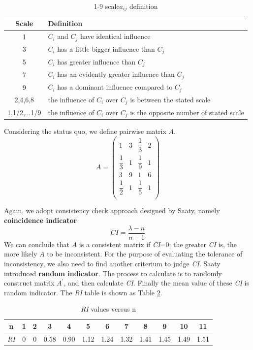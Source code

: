 \begin{table}[!htbp]
\centering\caption{1-9 scale$a_{ij}$ definition}\label{scale}
\begin{tabular}[ht]{cl}
   \hline
  Scale & Definition\\
   \hline
  1 & $C_i$ and $C_j$ have identical influence\\
  3 & $C_i$ has a little bigger influence than $C_j$ \\
  5 & $C_i$ has greater influence than $C_j$\\
  7 & $C_i$ has an evidently greater influence than $C_j$ \\
  9 & $C_i$ has a dominant influence compared to $C_j$ \\
  2,4,6,8 & the influence of $C_i$ over $C_j$ is between the stated scale \\
  1,1/2,...1/9 & the influence of $C_i$ over $C_j$ is the opposite number of stated scale \\
    \hline
\end{tabular}
\end{table}

Considering the status quo, we define pairwise matrix $A$.
\begin{equation}
A=\left( {\begin{array}{cccc}
    1 & 3 & \dfrac{1}{3} & 2 \\[2ex]
    \dfrac{1}{3} & 1 & \dfrac{1}{9} & 1 \\[2ex]
    3 & 9 & 1 & 6 \\
    \dfrac{1}{2} & 1 & \dfrac{1}{5} & 1 \\[2ex]
  \end{array}}
\right)
\end{equation}

Again, we adopt consistency check approach designed by Saaty, namely \textbf{coincidence indicator}
\begin{equation}
\textit{CI}=\dfrac{\lambda-n}{n-1}\label{CI}
\end{equation}
We can conclude that $A$ is a consistent matrix if \textit{CI}=0; the greater \textit{CI} is, the more likely $A$ to be inconsistent. For the purpose of evaluating the tolerance of inconsistency, we also need to find another criterium to judge \textit{CI}. Saaty introduced \textbf{random indicator}. The process to calculate is to randomly construct matrix $A^\prime$, and then calculate \textit{CI}. Finally the mean value of these \textit{CI} is random indicator. The \textit{RI} table is shown as Table \ref{RI}.
\begin{table}[!htbp]\label{RI}
\centering\caption{\textit{RI} values versus n}
\begin{tabular}{c|ccccccccccc}
  \hline
  n & 1 & 2 & 3 & 4 & 5 & 6 & 7 & 8 & 9 & 10 & 11 \\
  \hline
  \textit{RI} & 0 & 0 & 0.58 & 0.90 & 1.12 & 1.24 & 1.32 & 1.41 & 1.45 & 1.49 & 1.51 \\
  \hline
\end{tabular}
\end{table}

